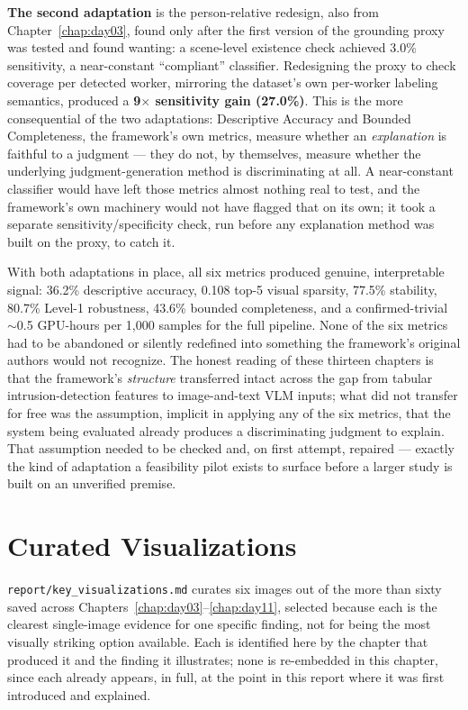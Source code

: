 \textbf{The second adaptation} is the person-relative redesign, also from
Chapter~\ref{chap:day03}, found only after the first version of the grounding proxy was tested
and found wanting: a scene-level existence check achieved 3.0\% sensitivity, a near-constant
``compliant'' classifier. Redesigning the proxy to check coverage per detected worker, mirroring
the dataset's own per-worker labeling semantics, produced a \textbf{9$\times$ sensitivity gain
(27.0\%)}. This is the more consequential of the two adaptations: Descriptive Accuracy and
Bounded Completeness, the framework's own metrics, measure whether an \emph{explanation} is
faithful to a judgment --- they do not, by themselves, measure whether the underlying
judgment-generation method is discriminating at all. A near-constant classifier would have left
those metrics almost nothing real to test, and the framework's own machinery would not have
flagged that on its own; it took a separate sensitivity/specificity check, run before any
explanation method was built on the proxy, to catch it.

With both adaptations in place, all six metrics produced genuine, interpretable signal: 36.2\%
descriptive accuracy, 0.108 top-5 visual sparsity, 77.5\% stability, 80.7\% Level-1 robustness,
43.6\% bounded completeness, and a confirmed-trivial $\sim$0.5 GPU-hours per 1,000 samples for
the full pipeline. None of the six metrics had to be abandoned or silently redefined into
something the framework's original authors would not recognize. The honest reading of these
thirteen chapters is that the framework's \emph{structure} transferred intact across the gap
from tabular intrusion-detection features to image-and-text VLM inputs; what did not transfer
for free was the assumption, implicit in applying any of the six metrics, that the system being
evaluated already produces a discriminating judgment to explain. That assumption needed to be
checked and, on first attempt, repaired --- exactly the kind of adaptation a feasibility pilot
exists to surface before a larger study is built on an unverified premise.

\section{Curated Visualizations}

\texttt{report/key\_visualizations.md} curates six images out of the more than sixty saved
across Chapters~\ref{chap:day03}--\ref{chap:day11}, selected because each is the clearest
single-image evidence for one specific finding, not for being the most visually striking option
available. Each is identified here by the chapter that produced it and the finding it
illustrates; none is re-embedded in this chapter, since each already appears, in full, at the
point in this report where it was first introduced and explained.

